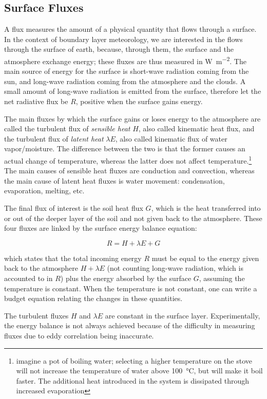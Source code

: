 \documentclass[a4paper,11pt]{kth-mag}
\begin{document}
\subsection{Surface Fluxes}
A flux measures the amount of a physical quantity that flows through a surface. In the context of boundary layer meteorology, we are interested in the flows through the surface of earth, because, through them, the surface and the atmosphere exchange energy; these fluxes are thus measured in \si{\watt\per\square\meter}. The main source of energy for the surface is short-wave radiation coming from the sun, and long-wave radiation coming from the atmosphere and the clouds. A small amount of long-wave radiation is emitted from the surface, therefore let the net radiative flux be $R$, positive when the surface gains energy.

The main fluxes by which the surface gains or loses energy to the atmosphere are called the turbulent flux of \emph{sensible heat} $H$, also called kinematic heat flux, and the turbulent flux of \emph{latent heat} $\lambda E$, also called kinematic flux of water vapor/moisture. The difference between the two is that the former causes an actual change of temperature, whereas the latter does not affect temperature.\footnote{imagine a pot of boiling water; selecting a higher temperature on the stove will not increase the temperature of water above \SI{100}{\celsius}, but will make it boil faster. The additional heat introduced in the system is dissipated through increased evaporation} The main causes of sensible heat fluxes are conduction and convection, whereas the main cause of latent heat fluxes is water movement: condensation, evaporation, melting, etc. 

The final flux of interest is the soil heat flux $G$, which is the heat transferred into or out of the deeper layer of the soil and not given back to the atmosphere. These four fluxes are linked by the surface energy balance equation:

$$
R=H+\lambda E+G
$$

\noindent which states that the total incoming energy $R$ must be equal to the energy given back to the atmosphere $H+\lambda E$ (not counting long-wave radiation, which is accounted to in $R$) plus the energy absorbed by the surface $G$, assuming the temperature is constant. When the temperature is not constant, one can write a budget equation relating the changes in these quantities.

The turbulent fluxes $H$ and $\lambda E$ are constant in the surface layer. Experimentally, the energy balance is not always achieved \citep{cabauwinsitu} because of the difficulty in measuring fluxes due to eddy correlation being inaccurate.
\end{document}
